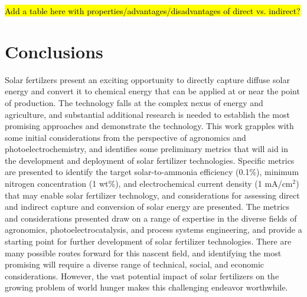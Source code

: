 \hl{Add a table here with properties/advantages/disadvantages of direct vs. indirect?}

\section{Conclusions}

Solar fertilzers present an exciting opportunity to directly capture diffuse solar energy and convert it to chemical energy that can be applied at or near the point of production. The technology falls at the complex nexus of energy and agriculture, and substantial additional research is needed to establish the most promising approaches and demonstrate the technology. This work grapples with some initial considerations from the perspective of agronomics and photoelectrochemistry, and identifies some preliminary metrics that will aid in the development and deployment of solar fertilizer technologies. Specific metrics are presented to identify the target solar-to-ammonia efficiency (0.1\%), minimum nitrogen concentration (1 wt\%), and electrochemical current density (1 mA/cm$^2$) that may enable solar fertilizer technology, and considerations for assessing direct and indirect capture and conversion of solar energy are presented. The metrics and considerations presented draw on a range of expertise in the diverse fields of agronomics, photoelectrocatalysis, and process systems engineering, and provide a starting point for further development of solar fertilizer technologies. There are many possible routes forward for this nascent field, and identifying the most promising will require a diverse range of technical, social, and economic considerations. However, the vast potential impact of solar fertilizers on the growing problem of world hunger makes this challenging endeavor worthwhile.


